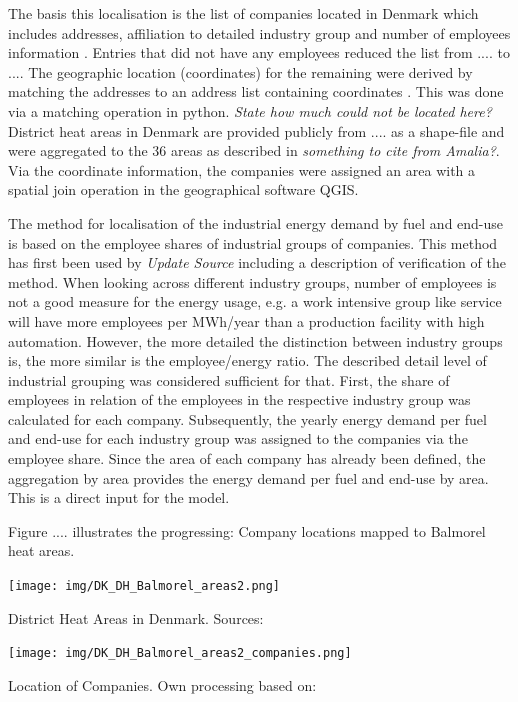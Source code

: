 \documentclass[review]{elsarticle}
\begin{document}
The basis this localisation is the list of companies located in Denmark which includes addresses, affiliation to detailed industry group and number of employees information \cite{virk2017}. Entries that did not have any employees reduced the list from .... to .... The geographic location (coordinates) for the remaining were derived by matching the addresses to an address list containing coordinates \cite{}. This was done via a matching operation in python. \textit{State how much could not be located here?} District heat areas in Denmark are provided publicly from .... as a shape-file \cite{kortforsyningen2017} and were aggregated to the 36 areas as described in \cite{Petrovic2014} \textit{something to cite from Amalia?}. Via the coordinate information, the companies were assigned an area with a spatial join operation in the geographical software QGIS.

The method for localisation of the industrial energy demand by fuel and end-use is based on the employee shares of industrial groups of companies. This method has first been used by \cite{Buehler2017} \textit{Update Source} including a description of verification of the method. When looking across different industry groups, number of employees is not a good measure for the energy usage, e.g. a work intensive group like service will have more employees per MWh/year than a production facility with high automation. However, the more detailed the distinction between industry groups is, the more similar is the employee/energy ratio. The described detail level of industrial grouping was considered sufficient for that. First, the share of employees in relation of the employees in the respective industry group was calculated for each company. Subsequently, the yearly energy demand per fuel and end-use for each industry group was assigned to the companies via the employee share. Since the area of each company has already been defined, the aggregation by area provides the energy demand per fuel and end-use by area. This is a direct input for the model.

Figure .... illustrates the progressing: Company locations mapped to Balmorel heat areas. 

\iffalse
\texttt{[image: img/DK\_DH\_Balmorel\_areas2.png]}
\caption{ District Heat Areas in Denmark. Sources: \cite{kortforsyningen2017,forsyningsomraade2017}}

\texttt{[image: img/DK\_DH\_Balmorel\_areas2\_companies.png]}
\caption{Location of Companies. Own processing based on: \cite{kortforsyningen2017,virk2017,aws2017,Buhler2017}}
\end{document}
